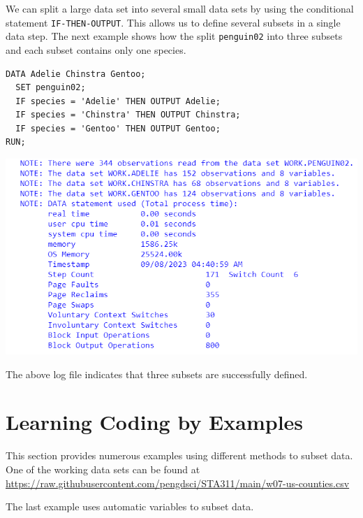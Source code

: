 \documentclass[
]{book}
\begin{document}
We can split a large data set into several small data sets by using the conditional statement \texttt{IF-THEN-OUTPUT}. This allows us to define several subsets in a single data step. The next example shows how the split \texttt{penguin02} into three subsets and each subset contains only one species.

\begin{verbatim}
DATA Adelie Chinstra Gentoo;
  SET penguin02;
  IF species = 'Adelie' THEN OUTPUT Adelie;
  IF species = 'Chinstra' THEN OUTPUT Chinstra;
  IF species = 'Gentoo' THEN OUTPUT Gentoo;
RUN;
\end{verbatim}

\begin{center}\includegraphics[width=1\linewidth]{img07/w07-IT_THEN_OUT-log} \end{center}

The above log file indicates that three subsets are successfully defined.

\hypertarget{learning-coding-by-examples-3}{%
\section{Learning Coding by Examples}\label{learning-coding-by-examples-3}}

This section provides numerous examples using different methods to subset data. One of the working data sets can be found at
\url{https://raw.githubusercontent.com/pengdsci/STA311/main/w07-us-counties.csv}

The last example uses automatic variables to subset data.
\end{document}

